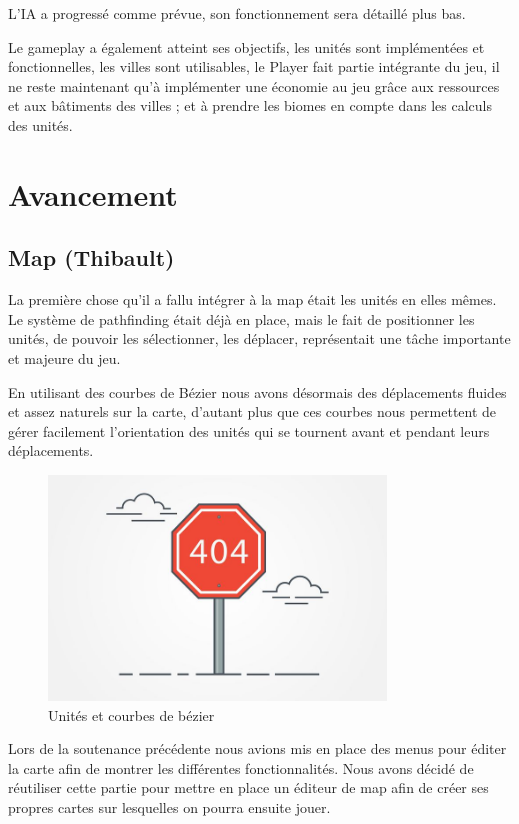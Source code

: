 \documentclass[12pt]{report}
\begin{document}
L’IA a progressé comme prévue, son fonctionnement sera détaillé plus bas.

Le gameplay a également atteint ses objectifs, les unités sont implémentées et fonctionnelles, les villes sont utilisables, le Player fait partie intégrante du jeu, il ne reste maintenant qu’à implémenter une économie au jeu grâce aux ressources et aux bâtiments des villes ; et à prendre les biomes en compte dans les calculs des unités.

\chapter{Avancement}

\section{Map (Thibault)}

La première chose qu'il a fallu intégrer à la map était les unités en elles mêmes. Le système de pathfinding était déjà en place, mais le fait de positionner les unités, de pouvoir les sélectionner, les déplacer, représentait une tâche importante et majeure du jeu. 

En utilisant des courbes de Bézier nous avons désormais des déplacements fluides et assez naturels sur la carte, d'autant plus que ces courbes nous permettent de gérer facilement l'orientation des unités qui se tournent avant et pendant leurs déplacements.

\begin{figure}[H]
    \centering
    \includegraphics[width=0.8\textwidth]{404}
    \caption{Unités et courbes de bézier}
\end{figure}

Lors de la soutenance précédente nous avions mis en place des menus pour éditer la carte afin de montrer les différentes fonctionnalités. Nous avons décidé de réutiliser cette partie pour mettre en place un éditeur de map afin de créer ses propres cartes sur lesquelles on pourra ensuite jouer.
\end{document}
